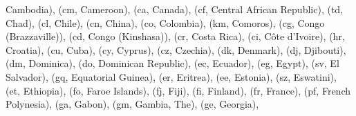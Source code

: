 \documentclass[letterpaper,10pt,english]{sphinxmanual}
\begin{document}
\begin{fulllineitems}
\begin{fulllineitems}
\textquotesingle{}Cambodia\textquotesingle{}), (\textquotesingle{}cm\textquotesingle{}, \textquotesingle{}Cameroon\textquotesingle{}), (\textquotesingle{}ca\textquotesingle{}, \textquotesingle{}Canada\textquotesingle{}), (\textquotesingle{}cf\textquotesingle{}, \textquotesingle{}Central African Republic\textquotesingle{}), (\textquotesingle{}td\textquotesingle{}, \textquotesingle{}Chad\textquotesingle{}), (\textquotesingle{}cl\textquotesingle{}, \textquotesingle{}Chile\textquotesingle{}), (\textquotesingle{}cn\textquotesingle{}, \textquotesingle{}China\textquotesingle{}), (\textquotesingle{}co\textquotesingle{}, \textquotesingle{}Colombia\textquotesingle{}), (\textquotesingle{}km\textquotesingle{}, \textquotesingle{}Comoros\textquotesingle{}), (\textquotesingle{}cg\textquotesingle{}, \textquotesingle{}Congo (Brazzaville)\textquotesingle{}), (\textquotesingle{}cd\textquotesingle{}, \textquotesingle{}Congo (Kinshasa)\textquotesingle{}), (\textquotesingle{}cr\textquotesingle{}, \textquotesingle{}Costa Rica\textquotesingle{}), (\textquotesingle{}ci\textquotesingle{}, \textquotesingle{}Côte d’Ivoire\textquotesingle{}), (\textquotesingle{}hr\textquotesingle{}, \textquotesingle{}Croatia\textquotesingle{}), (\textquotesingle{}cu\textquotesingle{}, \textquotesingle{}Cuba\textquotesingle{}), (\textquotesingle{}cy\textquotesingle{}, \textquotesingle{}Cyprus\textquotesingle{}), (\textquotesingle{}cz\textquotesingle{}, \textquotesingle{}Czechia\textquotesingle{}), (\textquotesingle{}dk\textquotesingle{}, \textquotesingle{}Denmark\textquotesingle{}), (\textquotesingle{}dj\textquotesingle{}, \textquotesingle{}Djibouti\textquotesingle{}), (\textquotesingle{}dm\textquotesingle{}, \textquotesingle{}Dominica\textquotesingle{}), (\textquotesingle{}do\textquotesingle{}, \textquotesingle{}Dominican Republic\textquotesingle{}), (\textquotesingle{}ec\textquotesingle{}, \textquotesingle{}Ecuador\textquotesingle{}), (\textquotesingle{}eg\textquotesingle{}, \textquotesingle{}Egypt\textquotesingle{}), (\textquotesingle{}sv\textquotesingle{}, \textquotesingle{}El Salvador\textquotesingle{}), (\textquotesingle{}gq\textquotesingle{}, \textquotesingle{}Equatorial Guinea\textquotesingle{}), (\textquotesingle{}er\textquotesingle{}, \textquotesingle{}Eritrea\textquotesingle{}), (\textquotesingle{}ee\textquotesingle{}, \textquotesingle{}Estonia\textquotesingle{}), (\textquotesingle{}sz\textquotesingle{}, \textquotesingle{}Eswatini\textquotesingle{}), (\textquotesingle{}et\textquotesingle{}, \textquotesingle{}Ethiopia\textquotesingle{}), (\textquotesingle{}fo\textquotesingle{}, \textquotesingle{}Faroe Islands\textquotesingle{}), (\textquotesingle{}fj\textquotesingle{}, \textquotesingle{}Fiji\textquotesingle{}), (\textquotesingle{}fi\textquotesingle{}, \textquotesingle{}Finland\textquotesingle{}), (\textquotesingle{}fr\textquotesingle{}, \textquotesingle{}France\textquotesingle{}), (\textquotesingle{}pf\textquotesingle{}, \textquotesingle{}French Polynesia\textquotesingle{}), (\textquotesingle{}ga\textquotesingle{}, \textquotesingle{}Gabon\textquotesingle{}), (\textquotesingle{}gm\textquotesingle{}, \textquotesingle{}Gambia, The\textquotesingle{}), (\textquotesingle{}ge\textquotesingle{}, \textquotesingle{}Georgia\textquotesingle{}), 
\end{fulllineitems}
\end{fulllineitems}
\end{document}
